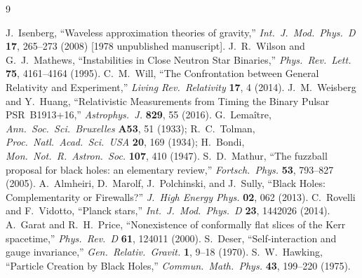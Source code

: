 \documentclass[11pt]{article}
\begin{document}
\begingroup\small
\begin{thebibliography}{9}
 J.~Isenberg, ``Waveless approximation theories of gravity,''
  \emph{Int.\ J.\ Mod.\ Phys.\ D} \textbf{17}, 265--273 (2008) [1978 unpublished manuscript].
 J.~R.~Wilson and G.~J.~Mathews, ``Instabilities in Close Neutron Star
  Binaries,'' \emph{Phys.\ Rev.\ Lett.} \textbf{75}, 4161--4164 (1995).
 C.~M.~Will, ``The Confrontation between General Relativity and Experiment,''
  \emph{Living Rev.\ Relativity} \textbf{17}, 4 (2014).
 J.~M.~Weisberg and Y.~Huang, ``Relativistic Measurements from Timing the
  Binary Pulsar PSR~B1913+16,'' \emph{Astrophys.\ J.} \textbf{829}, 55 (2016).
 G.~Lema\^itre, \emph{Ann.\ Soc.\ Sci.\ Bruxelles} \textbf{A53}, 51 (1933);
  R.~C.~Tolman, \emph{Proc.\ Natl.\ Acad.\ Sci.\ USA} \textbf{20}, 169 (1934);
  H.~Bondi, \emph{Mon.\ Not.\ R.\ Astron.\ Soc.} \textbf{107}, 410 (1947).
 S.~D.~Mathur, ``The fuzzball proposal for black holes: an elementary review,''
  \emph{Fortsch.\ Phys.} \textbf{53}, 793--827 (2005).
 A.~Almheiri, D.~Marolf, J.~Polchinski, and J.~Sully, ``Black Holes:
  Complementarity or Firewalls?'' \emph{J.\ High Energy Phys.} \textbf{02}, 062 (2013).
 C.~Rovelli and F.~Vidotto, ``Planck stars,''
  \emph{Int.\ J.\ Mod.\ Phys.\ D} \textbf{23}, 1442026 (2014).
 A.~Garat and R.~H.~Price, ``Nonexistence of conformally flat slices of the
  Kerr spacetime,'' \emph{Phys.\ Rev.\ D} \textbf{61}, 124011 (2000).
 S.~Deser, ``Self-interaction and gauge invariance,''
  \emph{Gen.\ Relativ.\ Gravit.} \textbf{1}, 9--18 (1970).
 S.~W.~Hawking, ``Particle Creation by Black Holes,''
  \emph{Commun.\ Math.\ Phys.} \textbf{43}, 199--220 (1975).
\end{thebibliography}
\endgroup
\end{document}
